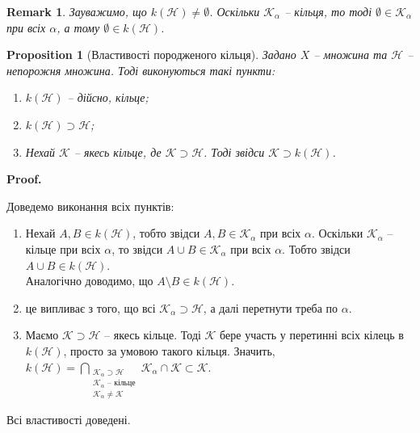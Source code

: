 \documentclass[a4paper, 10pt]{article}
\makeatletter
\theoremstyle{theoremdd}
\newtheorem{proposition}[theorem]{Proposition}
\newtheorem{remark}[theorem]{Remark}
\renewenvironment{proof}[1][Proof.\\]{\par
\pushQED{\hfill \qed}%
\normalfont \topsep6\p@\@plus6\p@\relax
\trivlist
\item\relax
{\bfseries
#1\@addpunct{.}}\hspace\labelsep\ignorespaces
}{%
\popQED\endtrivlist\@endpefalse
}
\makeatother
\begin{document}
\begin{remark}
Зауважимо, що $k(\mathcal{H}) \neq \emptyset$. Оскільки $\mathcal{K}_\alpha$ -- кільця, то тоді $\emptyset \in \mathcal{K}_\alpha$ при всіх $\alpha$, а тому $\emptyset \in k(\mathcal{H})$.
\end{remark}

\begin{proposition}[Властивості породженого кільця]
Задано $X$ -- множина та $\mathcal{H}$ -- непорожня множина. Тоді виконуються такі пункти:
\begin{enumerate}[nosep, wide=0pt, label={\arabic*)}]
\item $k(\mathcal{H})$ -- дійсно, кільце;
\item $k(\mathcal{H}) \supset \mathcal{H}$;
\item Нехай $\mathcal{K}$ -- якесь кільце, де $\mathcal{K} \supset \mathcal{H}$. Тоді звідси $\mathcal{K} \supset k(\mathcal{H})$.
\end{enumerate}
\end{proposition}

\begin{proof}
Доведемо виконання всіх пунктів:
\begin{enumerate}[wide=0pt, label={\arabic*)}]
\item Нехай $A,B \in k(\mathcal{H})$, тобто звідси $A,B \in \mathcal{K}_\alpha$ при всіх $\alpha$. Оскільки $\mathcal{K}_\alpha$ -- кільце при всіх $\alpha$, то звідси $A \cup B \in \mathcal{K}_\alpha$ при всіх $\alpha$. Тобто звідси $A \cup B \in k(\mathcal{H})$.\\
Аналогічно доводимо, що $A \setminus B \in k(\mathcal{H})$.

\item це випливає з того, що всі $\mathcal{K}_\alpha \supset \mathcal{H}$, а далі перетнути треба по $\alpha$.

\item Маємо $\mathcal{K} \supset \mathcal{H}$ -- якесь кільце. Тоді $\mathcal{K}$ бере участь у перетинні всіх кілець в $k(\mathcal{H})$, просто за умовою такого кільця. Значить, $k(\mathcal{H}) = \displaystyle\bigcap_{\substack{\mathcal{K}_\alpha \supset \mathcal{H} \\ \mathcal{K}_\alpha \text{ -- кільце} \\ \mathcal{K}_\alpha \neq \mathcal{K}}} \mathcal{K}_\alpha \cap \mathcal{K} \subset \mathcal{K}$.
\end{enumerate}
Всі властивості доведені.
\end{proof}
\end{document}
